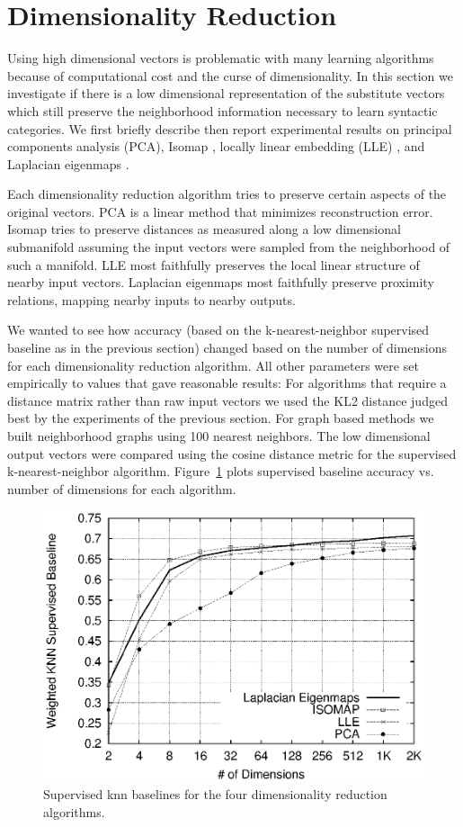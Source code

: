 \documentclass[11pt]{article}
\begin{document}

\section{Dimensionality Reduction}
\label{sec:dimreduce}

Using high dimensional vectors is problematic with many learning
algorithms because of computational cost and the curse of
dimensionality.  In this section we investigate if there is a low
dimensional representation of the substitute vectors which still
preserve the neighborhood information necessary to learn syntactic
categories.  We first briefly describe then report experimental
results on principal components analysis (PCA), Isomap
\cite{tenenbaum2000global}, locally linear embedding (LLE)
\cite{roweis2000nonlinear}, and Laplacian eigenmaps
\cite{belkin2003laplacian}.  

Each dimensionality reduction algorithm tries to preserve certain
aspects of the original vectors.  PCA is a linear method that
minimizes reconstruction error.  Isomap tries to preserve distances as
measured along a low dimensional submanifold assuming the input
vectors were sampled from the neighborhood of such a manifold.  LLE
most faithfully preserves the local linear structure of nearby input
vectors.  Laplacian eigenmaps most faithfully preserve proximity
relations, mapping nearby inputs to nearby outputs.

We wanted to see how accuracy (based on the k-nearest-neighbor
supervised baseline as in the previous section) changed based on the
number of dimensions for each dimensionality reduction algorithm.  All
other parameters were set empirically to values that gave reasonable
results: For algorithms that require a distance matrix rather than raw
input vectors we used the KL2 distance judged best by the experiments
of the previous section.  For graph based methods we built
neighborhood graphs using 100 nearest neighbors.  The low dimensional
output vectors were compared using the cosine distance metric for the
supervised k-nearest-neighbor algorithm.  Figure~\ref{fig:dimreduce}
plots supervised baseline accuracy vs. number of dimensions for each
algorithm.

\begin{figure}[h]
\includegraphics[width=.5\textwidth]{baseline_graph_mono.eps}
\caption{Supervised knn baselines for the four dimensionality
  reduction algorithms.}
\label{fig:dimreduce}
\end{figure}
\end{document}
